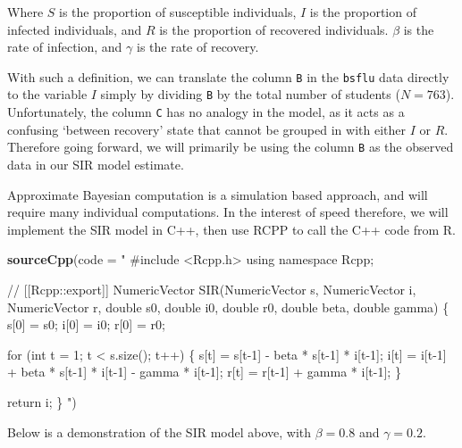 \documentclass[
]{article}
\newenvironment{Shaded}{\begin{snugshade}}{\end{snugshade}}
\newcommand{\AttributeTok}[1]{\textcolor[rgb]{0.13,0.29,0.53}{#1}}
\newcommand{\FunctionTok}[1]{\textcolor[rgb]{0.13,0.29,0.53}{\textbf{#1}}}
\newcommand{\NormalTok}[1]{#1}
\newcommand{\StringTok}[1]{\textcolor[rgb]{0.31,0.60,0.02}{#1}}
\begin{document}
Where \(S\) is the proportion of susceptible individuals, \(I\) is the
proportion of infected individuals, and \(R\) is the proportion of
recovered individuals. \(\beta\) is the rate of infection, and
\(\gamma\) is the rate of recovery.

With such a definition, we can translate the column \texttt{B} in the
\texttt{bsflu} data directly to the variable \(I\) simply by dividing
\texttt{B} by the total number of students (\(N=763\)). Unfortunately,
the column \texttt{C} has no analogy in the model, as it acts as a
confusing `between recovery' state that cannot be grouped in with either
\(I\) or \(R\). Therefore going forward, we will primarily be using the
column \texttt{B} as the observed data in our SIR model estimate.

Approximate Bayesian computation is a simulation based approach, and
will require many individual computations. In the interest of speed
therefore, we will implement the SIR model in C++, then use RCPP to call
the C++ code from R.

\begin{Shaded}
\begin{Highlighting}[]
\FunctionTok{sourceCpp}\NormalTok{(}\AttributeTok{code =} \StringTok{"}
\StringTok{  \#include \textless{}Rcpp.h\textgreater{}}
\StringTok{  using namespace Rcpp;}

\StringTok{  // [[Rcpp::export]]}
\StringTok{  NumericVector SIR(NumericVector s, NumericVector i, NumericVector r, double s0, double i0, double r0, double beta, double gamma) \{}
\StringTok{    s[0] = s0;}
\StringTok{    i[0] = i0;}
\StringTok{    r[0] = r0;}

\StringTok{    for (int t = 1; t \textless{} s.size(); t++) \{}
\StringTok{      s[t] = s[t{-}1] {-} beta * s[t{-}1] * i[t{-}1];}
\StringTok{      i[t] = i[t{-}1] + beta * s[t{-}1] * i[t{-}1] {-} gamma * i[t{-}1];}
\StringTok{      r[t] = r[t{-}1] + gamma * i[t{-}1];}
\StringTok{    \}}

\StringTok{    return i;}
\StringTok{  \}}
\StringTok{"}\NormalTok{)}
\end{Highlighting}
\end{Shaded}

Below is a demonstration of the SIR model above, with \(\beta = 0.8\)
and \(\gamma = 0.2\).
\end{document}
